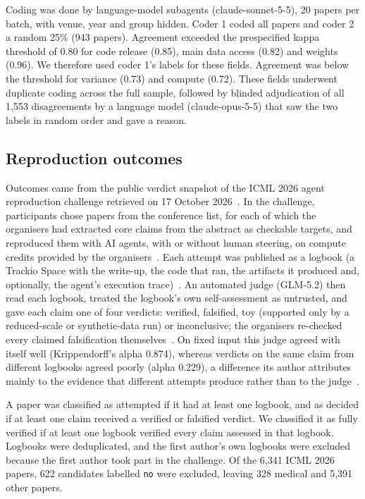 \documentclass[11pt]{article}
\begin{document}
Coding was done by language-model subagents (claude-sonnet-5-5), 20 papers per batch, with venue, year and group hidden. Coder 1 coded all papers and coder 2 a random 25\% (943 papers). Agreement exceeded the prespecified kappa threshold of 0.80 for code release (0.85), main data access (0.82) and weights (0.96). We therefore used coder 1's labels for these fields. Agreement was below the threshold for variance (0.73) and compute (0.72). These fields underwent duplicate coding across the full sample, followed by blinded adjudication of all 1,553 disagreements by a language model (claude-opus-5-5) that saw the two labels in random order and gave a reason.

\subsection*{Reproduction outcomes}
Outcomes came from the public verdict snapshot of the ICML 2026 agent reproduction challenge retrieved on 17 October 2026~\cite{r9}. In the challenge, participants chose papers from the conference list, for each of which the organisers had extracted core claims from the abstract as checkable targets, and reproduced them with AI agents, with or without human steering, on compute credits provided by the organisers~\cite{r9}. Each attempt was published as a logbook (a Trackio Space with the write-up, the code that ran, the artifacts it produced and, optionally, the agent's execution trace)~\cite{r9}. An automated judge (GLM-5.2) then read each logbook, treated the logbook's own self-assessment as untrusted, and gave each claim one of four verdicts: verified, falsified, toy (supported only by a reduced-scale or synthetic-data run) or inconclusive; the organisers re-checked every claimed falsification themselves~\cite{r9}. On fixed input this judge agreed with itself well (Krippendorff's alpha 0.874), whereas verdicts on the same claim from different logbooks agreed poorly (alpha 0.229), a difference its author attributes mainly to the evidence that different attempts produce rather than to the judge~\cite{r13}.

A paper was classified as attempted if it had at least one logbook, and as decided if at least one claim received a verified or falsified verdict. We classified it as fully verified if at least one logbook verified every claim assessed in that logbook. Logbooks were deduplicated, and the first author's own logbooks were excluded because the first author took part in the challenge. Of the 6,341 ICML 2026 papers, 622 candidates labelled \texttt{no} were excluded, leaving 328 medical and 5,391 other papers.
\end{document}
